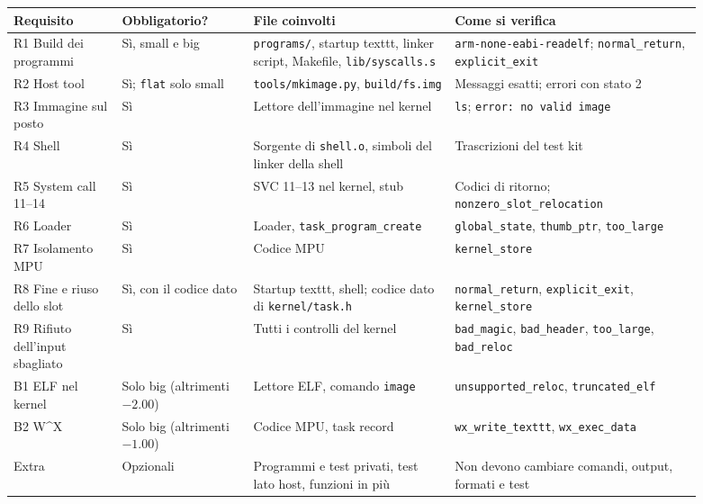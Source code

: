 \begin{center}
\small
\setlength{\tabcolsep}{4pt}
\begin{tabular}{|p{0.14\linewidth}|p{0.17\linewidth}|p{0.26\linewidth}|p{0.32\linewidth}|}
\hline
\raggedright Requisito & \raggedright Obbligatorio? & \raggedright File coinvolti & \raggedright Come si verifica \tabularnewline
\hline\hline
\raggedright R1 Build dei programmi & \raggedright Sì, small e big & \raggedright \texttt{programs/}, startup texttt, linker script, Makefile, \texttt{lib/syscalls.s} & \raggedright \texttt{arm-none-eabi-readelf}; \texttt{normal\_return}, \texttt{explicit\_exit} \tabularnewline
\hline
\raggedright R2 Host tool & \raggedright Sì; \texttt{flat} solo small & \raggedright \texttt{tools/mkimage.py}, \texttt{build/fs.img} & \raggedright Messaggi esatti; errori con stato 2 \tabularnewline
\hline
\raggedright R3 Immagine sul posto & \raggedright Sì & \raggedright Lettore dell'immagine nel kernel & \raggedright \texttt{ls}; \texttt{error:\ no valid image} \tabularnewline
\hline
\raggedright R4 Shell & \raggedright Sì & \raggedright Sorgente di \texttt{shell.o}, simboli del linker della shell & \raggedright Trascrizioni del test kit \tabularnewline
\hline
\raggedright R5 System call 11--14 & \raggedright Sì & \raggedright SVC 11--13 nel kernel, stub & \raggedright Codici di ritorno; \texttt{nonzero\_\allowbreak slot\_\allowbreak relocation} \tabularnewline
\hline
\raggedright R6 Loader & \raggedright Sì & \raggedright Loader, \texttt{task\_\allowbreak program\_\allowbreak create} & \raggedright \texttt{global\_state}, \texttt{thumb\_ptr}, \texttt{too\_large} \tabularnewline
\hline
\raggedright R7 Isolamento MPU & \raggedright Sì & \raggedright Codice MPU & \raggedright \texttt{kernel\_store} \tabularnewline
\hline
\raggedright R8 Fine e riuso dello slot & \raggedright Sì, con il codice dato & \raggedright Startup texttt, shell; codice dato di \texttt{kernel/task.h} & \raggedright \texttt{normal\_return}, \texttt{explicit\_exit}, \texttt{kernel\_store} \tabularnewline
\hline
\raggedright R9 Rifiuto dell'input sbagliato & \raggedright Sì & \raggedright Tutti i controlli del kernel & \raggedright \texttt{bad\_magic}, \texttt{bad\_header}, \texttt{too\_large}, \texttt{bad\_reloc} \tabularnewline
\hline
\raggedright B1 ELF nel kernel & \raggedright Solo big (altrimenti $-2.00$) & \raggedright Lettore ELF, comando \texttt{image} & \raggedright \texttt{unsupported\_reloc}, \texttt{truncated\_elf} \tabularnewline
\hline
\raggedright B2 W\textasciicircum{}X & \raggedright Solo big (altrimenti $-1.00$) & \raggedright Codice MPU, task record & \raggedright \texttt{wx\_write\_texttt}, \texttt{wx\_exec\_data} \tabularnewline
\hline
\raggedright Extra & \raggedright Opzionali & \raggedright Programmi e test privati, test lato host, funzioni in più & \raggedright Non devono cambiare comandi, output, formati e test \tabularnewline
\hline
\end{tabular}
\end{center}


